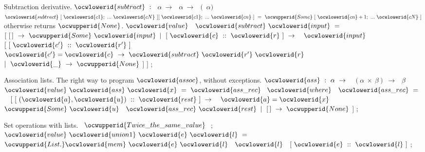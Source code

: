 \documentclass[12pt]{article}
\begin{document}
\ocwendcode{}\ocwindent{0.00em}
Subtraction derivative. 
\ocweol
\ocwindent{0.00em}
\ocwbegindcode{}$\ocwlowerid{subtract}~:~$~$\alpha{}~\rightarrow{}~$~$\alpha{}~\rightarrow{}~$~$($~$\alpha{})$\ocwenddcode{}              
\ocweol
\ocwindent{0.00em}
\ocwbegindcode{}$\ocwlowerid{subtract}~[~\ocwlowerid{c1};~...~\ocwlowerid{cN}~][~\ocwlowerid{c1};~...~\ocwlowerid{cn}~]~=~\ocwupperid{Some}~[~\ocwlowerid{cn}+1;~...~\ocwlowerid{cN}~]$\ocwenddcode{}  
\ocweol
\ocwindent{0.00em}
otherwise returns \ocwbegindcode{}$\ocwupperid{None}$\ocwenddcode{}.                                         
\ocweol
\label{../ML/list2.ml:1192}%
\medskip
\ocwbegincode{}\ocwindent{0.00em}
$\ocwlowerid{value}~$~$\ocwlowerid{subtract}~\ocwlowerid{input}~=~$\ocweol
\ocwindent{1.00em}
$[~[\,]~\rightarrow{}~\ocwupperid{Some}~\ocwlowerid{input}$\ocweol
\ocwindent{1.00em}
$\mid{}~[~\ocwlowerid{c}~::~\ocwlowerid{r}~]~\rightarrow{}~$~$\ocwlowerid{input}~$~\ocweol
\ocwindent{2.50em}
$[~[~\ocwlowerid{c'}~::~\ocwlowerid{r'}~]~$~$\ocwlowerid{c'}=\ocwlowerid{c}~\rightarrow{}~\ocwlowerid{subtract}~\ocwlowerid{r'}~\ocwlowerid{r}$\ocweol
\ocwindent{2.50em}
$\mid{}~\ocwlowerid{\_}~\rightarrow{}~\ocwupperid{None}$\ocweol
\ocwindent{2.50em}
$]$\ocweol
\ocwindent{1.00em}
$]$\ocweol
\ocwindent{0.00em}
;\medskip

\ocwendcode{}\ocwindent{0.00em}
Association lists. 
\ocweol
\ocwindent{0.00em}
The right way to program \ocwbegindcode{}$\ocwlowerid{assoc}$\ocwenddcode{}, without exceptions. 
\ocweol
\ocwindent{0.00em}
\ocwbegindcode{}$\ocwlowerid{ass}~:~\alpha{}~\rightarrow{}~$~$(\alpha{}~\times{}~\beta{})~\rightarrow{}~$~$\beta{}$\ocwenddcode{} 
\ocweol
\label{../ML/list2.ml:1492}%
\medskip
\ocwbegincode{}\ocwindent{0.00em}
$\ocwlowerid{value}~\ocwlowerid{ass}~\ocwlowerid{x}~=~\ocwlowerid{ass\_rec}~$\ocweol
\ocwindent{1.00em}
$\ocwlowerid{where}~$~$\ocwlowerid{ass\_rec}~=~$~\ocweol
\ocwindent{1.00em}
$[~[~(\ocwlowerid{a},\ocwlowerid{u})~::~\ocwlowerid{rest}~]~\rightarrow{}~$~$\ocwlowerid{a}=\ocwlowerid{x}~$~$\ocwupperid{Some}~\ocwlowerid{u}~$~$\ocwlowerid{ass\_rec}~\ocwlowerid{rest}$\ocweol
\ocwindent{1.00em}
$\mid{}~[\,]~\rightarrow{}~\ocwupperid{None}$\ocweol
\ocwindent{1.00em}
$]$\ocweol
\ocwindent{0.00em}
;\medskip

\ocwendcode{}\ocwindent{0.00em}
Set operations with lists. 
\ocweol
\label{../ML/list2.ml:1660}%
\medskip
\ocwbegincode{}\ocwindent{0.00em}
~$\ocwupperid{Twice\_the\_same\_value}~$\ocweol
\ocwindent{0.00em}
;\ocweol
\ocwindent{0.00em}
$\ocwlowerid{value}~\ocwlowerid{union1}~\ocwlowerid{e}~\ocwlowerid{l}~=~$\ocweol
\ocwindent{1.00em}
~$\ocwupperid{List.}\ocwlowerid{mem}~\ocwlowerid{e}~\ocwlowerid{l}~$~$\ocwlowerid{l}~$~$[~\ocwlowerid{e}~::~\ocwlowerid{l}~]$\ocweol
\ocwindent{0.00em}
;\medskip
\end{document}
